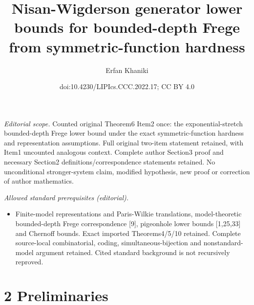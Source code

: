 \documentclass[10pt,a4paper]{article}
\title{Nisan-Wigderson generator lower bounds for bounded-depth Frege from symmetric-function hardness}
\author{Erfan Khaniki}
\date{doi:10.4230/LIPIcs.CCC.2022.17; CC BY 4.0}
\begin{document}
\maketitle
\noindent\textit{Editorial scope.} Counted original Theorem6 Item2 once: the exponential-stretch bounded-depth Frege lower bound under the exact symmetric-function hardness and representation assumptions. Full original two-item statement retained, with Item1 uncounted analogous context. Complete author Section3 proof and necessary Section2 definitions/correspondence statements retained. No unconditional stronger-system claim, modified hypothesis, new proof or correction of author mathematics.\par\medskip
\noindent\textit{Allowed standard prerequisites (editorial).}\begin{itemize}
\item Finite-model representations and Paris-Wilkie translations, model-theoretic bounded-depth Frege correspondence [9], pigeonhole lower bounds [1,25,33] and Chernoff bounds. Exact imported Theorems4/5/10 retained. Complete source-local combinatorial, coding, simultaneous-bijection and nonstandard-model argument retained. Cited standard background is not recursively reproved.
\end{itemize}\medskip
\section*{2 Preliminaries}
\end{document}
